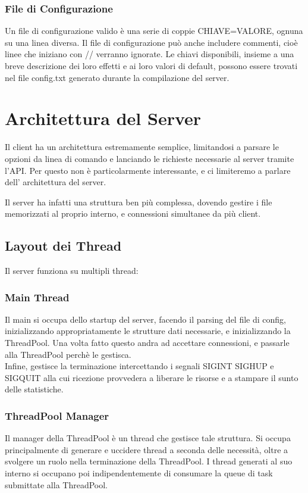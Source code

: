 \documentclass[11pt]{article}
\begin{document}
\begin{flushleft}
\subsubsection{File di Configurazione}

Un file di configurazione valido è una serie di coppie CHIAVE=VALORE, ognuna su una linea diversa.
Il file di configurazione può anche includere commenti, cioè linee che iniziano con // verranno ignorate. Le chiavi disponibili, insieme a una breve descrizione dei loro effetti e ai loro valori di default, possono essere trovati nel file config.txt generato durante la compilazione del server.


\section{Architettura del Server}

Il client ha un architettura estremamente semplice, limitandosi a parsare le opzioni da linea di comando e lanciando le richieste necessarie al server tramite l'API. Per questo non è particolarmente interessante, e ci limiteremo a parlare dell' architettura del server.

Il server ha infatti una struttura ben più complessa, dovendo gestire i file memorizzati al proprio interno, e connessioni simultanee da più client. 

\subsection{Layout dei Thread}
Il server funziona su multipli thread:

\subsubsection{Main Thread}
Il main si occupa dello startup del server, facendo il parsing del file di config, inizializzando appropriatamente le strutture dati necessarie, e inizializzando la ThreadPool. Una volta fatto questo andra ad accettare connessioni, e passarle alla ThreadPool perchè le gestisca.
\\Infine, gestisce la terminazione intercettando i segnali SIGINT SIGHUP e SIGQUIT alla cui ricezione provvedera a liberare le risorse e a stampare il sunto delle statistiche.

\subsubsection{ThreadPool Manager}
Il manager della ThreadPool è un thread che gestisce tale struttura. Si occupa principalmente di generare e uccidere thread a seconda delle necessità, oltre a svolgere un ruolo nella terminazione della ThreadPool. I thread generati al suo interno si occupano poi indipendentemente di consumare la queue di task submittate alla ThreadPool.


\end{flushleft}
\end{document}
